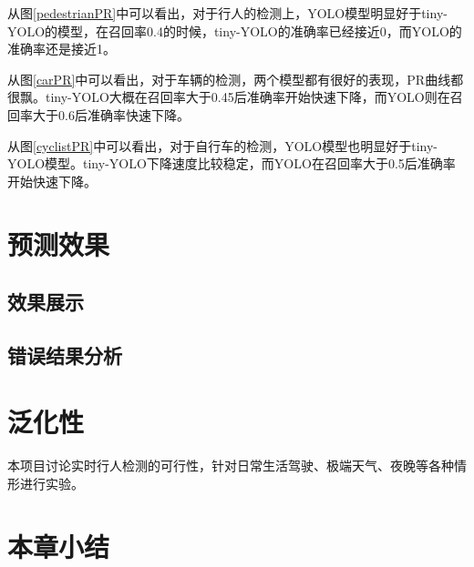 {	从图\ref{pedestrianPR}中可以看出，对于行人的检测上，YOLO模型明显好于tiny-YOLO的模型，在召回率0.4的时候，tiny-YOLO的准确率已经接近0，而YOLO的准确率还是接近1。

	从图\ref{carPR}中可以看出，对于车辆的检测，两个模型都有很好的表现，PR曲线都很飘。tiny-YOLO大概在召回率大于0.45后准确率开始快速下降，而YOLO则在召回率大于0.6后准确率快速下降。

	从图\ref{cyclistPR}中可以看出，对于自行车的检测，YOLO模型也明显好于tiny-YOLO模型。tiny-YOLO下降速度比较稳定，而YOLO在召回率大于0.5后准确率开始快速下降。
}

\section{预测效果}{
	\subsection{效果展示}

	\subsection{错误结果分析}
}

\section{泛化性}{
	本项目讨论实时行人检测的可行性，针对日常生活驾驶、极端天气、夜晚等各种情形进行实验。
}

\section{本章小结}


